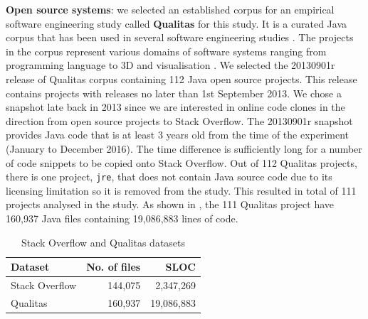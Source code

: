 \documentclass[sigconf,review, anonymous]{acmart}
\begin{document}
\textbf{Open source systems}: we selected an established corpus for an empirical software engineering study called \textbf{Qualitas} \cite{QualitasCorpus} for this study. It is a curated Java corpus that has been used in several software engineering studies \cite{Taube-Schock2011,Beckman2011,Vasilescu2011,Omar2012}. The projects in the corpus represent various domains of software systems ranging from programming language to 3D and visualisation \cite{QualitasCorpus}. We selected the 20130901r release of Qualitas corpus containing 112 Java open source projects. This release contains projects with releases no later than 1st September 2013. We chose a snapshot late back in 2013 since we are interested in online code clones in the direction from open source projects to Stack Overflow. The 20130901r snapshot provides Java code that is at least 3 years old from the time of the experiment (January to December 2016). The time difference is sufficiently long for a number of code snippets to be copied onto Stack Overflow. Out of 112 Qualitas projects, there is one project, \texttt{jre}, that does not contain Java source code due to its licensing limitation \cite{QualitasCorpus} so it is removed from the study. This resulted in total of 111 projects analysed in the study. As shown in , the 111 Qualitas project have 160,937 Java files containing 19,086,883 lines of code. %

\begin{table}
	\centering
	\caption{Stack Overflow and Qualitas datasets}
	\label{tab:datasets}
	\small
	\begin{tabular}{l|r|r}
		\hline 
		Dataset & No. of files & SLOC \\
		\hline
		Stack Overflow & 144,075 & 2,347,269 \\ 
		\hline 
		Qualitas &  160,937 & 19,086,883 \\ 
		\hline 
	\end{tabular} 
\end{table}
\end{document}
